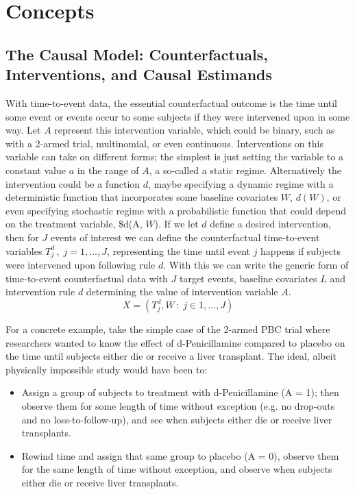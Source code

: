 \documentclass{report}
\newcommand{\1}{\ensuremath{\mathbf{1}}}
\renewcommand{\L}{\ensuremath{W}}
\begin{document}
\chapter{Concepts}
\section{The Causal Model: Counterfactuals, Interventions, and Causal Estimands}
With time-to-event data, the essential counterfactual outcome is the time until some event or events occur to some subjects if they were intervened upon in some way. Let \(A\) represent this intervention variable, which could be binary, such as with a 2-armed trial, multinomial, or even continuous. Interventions on this variable can take on different forms; the simplest is just setting the variable to a constant value \(a\) in the range of \(A\), a so-called a static regime. Alternatively the intervention could be a function \(d\), maybe specifying a dynamic regime with a deterministic function that incorporates some baseline covariates \(\L\), \(d(\L)\), or even specifying stochastic regime with a probabilistic function that could depend on the treatment variable, \$d(A, \L). If we let \(d\) define a desired intervention, then for \(J\) events of interest we can define the counterfactual time-to-event variables \(T^d_j \,,\; j = 1, ..., J\), representing the time until event \(j\) happens if subjects were intervened upon following rule \(d\). With this we can write the generic form of time-to-event counterfactual data with \(J\) target events, baseline covariates \(L\) and intervention rule \(d\) determining the value of intervention variable \(A\).
\[ X = \left( T^d_j, \L \,:\; j \in 1, \dots, J \right)\]

For a concrete example, take the simple case of the 2-armed PBC trial where researchers wanted to know the effect of d-Penicillamine compared to placebo on the time until subjects either die or receive a liver transplant. The ideal, albeit physically impossible study would have been to:
\begin{itemize}
\item Assign a group of subjects to treatment with d-Penicillamine (A = 1); then observe them for some length of time without exception (e.g. no drop-outs and no loss-to-follow-up), and see when subjects either die or receive liver transplants.
\item Rewind time and assign that same group to placebo (A = 0), observe them for the same length of time without exception, and observe when subjects either die or receive liver transplants.
\end{itemize}
\end{document}
